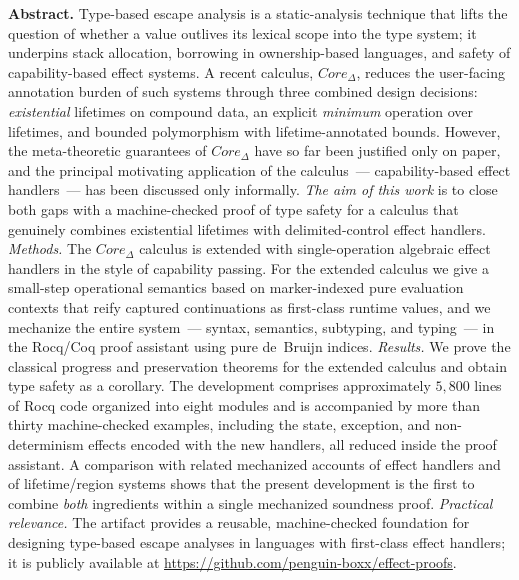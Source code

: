 \documentclass[12pt,a4paper]{article}
\begin{document}
    \vspace{0.5em}
    \noindent\textbf{Abstract.}
    Type-based escape analysis is a static-analysis technique that lifts the question of
    whether a value outlives its lexical scope into the type system; it underpins
    stack allocation, borrowing in ownership-based languages, and safety of capability-based
    effect systems.
    A recent calculus, $Core_\Delta$, reduces the user-facing annotation burden of such systems
    through three combined design decisions: \emph{existential} lifetimes on compound data,
    an explicit \emph{minimum} operation over lifetimes, and bounded polymorphism with
    lifetime-annotated bounds.
    However, the meta-theoretic guarantees of $Core_\Delta$ have so far been justified only on paper,
    and the principal motivating application of the calculus~--- capability-based effect
    handlers~--- has been discussed only informally.
    \emph{The aim of this work} is to close both gaps with a machine-checked proof of type safety
    for a calculus that genuinely combines existential lifetimes with delimited-control effect handlers.
    \emph{Methods.}
    The $Core_\Delta$ calculus is extended with single-operation algebraic effect handlers in the style
    of capability passing.
    For the extended calculus we give a small-step operational semantics based on
    marker-indexed pure evaluation contexts that reify captured continuations as first-class
    runtime values, and we mechanize the entire system~--- syntax, semantics, subtyping, and typing~---
    in the Rocq/Coq proof assistant using pure de~Bruijn indices.
    \emph{Results.}
    We prove the classical progress and preservation theorems for the extended calculus and
    obtain type safety as a corollary.
    The development comprises approximately $5{,}800$ lines of Rocq code organized into eight modules
    and is accompanied by more than thirty machine-checked examples, including the state, exception,
    and non-determinism effects encoded with the new handlers, all reduced inside the proof assistant.
    A comparison with related mechanized accounts of effect handlers and of lifetime/region systems
    shows that the present development is the first to combine
    \emph{both} ingredients within a single mechanized soundness proof.
    \emph{Practical relevance.}
    The artifact provides a reusable, machine-checked foundation for designing type-based escape
    analyses in languages with first-class effect handlers; it is publicly available at
    \url{https://github.com/penguin-boxx/effect-proofs}.
\end{document}
